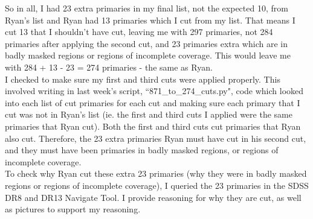 \documentclass[10pt,letterpaper]{article}
\begin{document}
So in all, I had 23 extra primaries in my final list, not the expected 10, from Ryan's list and Ryan had 13 primaries which I cut from my list. That means I cut 13 that I shouldn't have cut, leaving me with 297 primaries, not 284 primaries after applying the second cut, and 23 primaries extra which are in badly masked regions or regions of incomplete coverage. This would leave me with 284 + 13 - 23 = 274 primaries - the same as Ryan.\\

I checked to make sure my first and third cuts were applied properly. This involved writing in last week's script, ``871\_to\_274\_cuts.py", code which looked into each list of cut primaries for each cut and making sure each primary that I cut was not in Ryan's list (ie. the first and third cuts I applied were the same primaries that Ryan cut). Both the first and third cuts cut primaries that Ryan also cut. Therefore, the 23 extra primaries Ryan must have cut in his second cut, and they must have been primaries in badly masked regions, or regions of incomplete coverage.\\

To check why Ryan cut these extra 23 primaries (why they were in badly masked regions or regions of incomplete coverage), I queried the 23 primaries in the SDSS DR8 and DR13 Navigate Tool. I provide reasoning for why they are cut, as well as pictures to support my reasoning.\\
\end{document}
